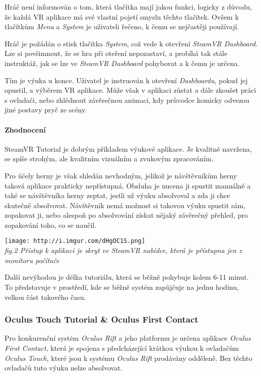 Hráč není informován o tom, která tlačítka mají jakou funkci, logicky z
důvodu, že každá VR aplikace má své vlastní pojetí smyslu těchto
tlačítek. Ovšem k tlačítkům \emph{Menu} a \emph{System} je uživateli
řečeno, k čemu se nejčastěji používají.

Hráč je požádán o stisk tlačítka \emph{System}, což vede k otevření
\emph{SteamVR Dashboard}. Lze si povšimnout, že se hra při oteření
nepozastaví, a probíhá tak stále instruktáž, jak se lze ve \emph{SteamVR
Dashboard} pohybovat a k čemu je určena.

Tím je výuka u konce. Uživatel je instruován k otevření
\emph{Dashboardu}, pokud jej opustil, a výběrem VR aplikace. Může však v
aplikaci zůstat a dále zkoušet práci s ovladači, nebo zhlédnout
závěrečnou animaci, kdy průvodce komicky odvezou jiné postavy pryč ze
scény.

\paragraph{Zhodnocení}\label{zhodnocenuxed}

SteamVR Tutorial je dobrým příkladem výukové aplikace. Je kvalitně
navržena, se spíše strohým, ale kvalitním vizuálním a zvukovým
zpracováním.

Pro účely herny je však shledán nevhodným, jelikož je návštěvníkům herny
taková aplikace prakticky nepřístupná. Obsluha je nucena ji spustit
manuálně a také se návštěvníka herny zeptat, jestli už výuku absolvoval
a zda ji chce skutečně absolvovat. Návštěvník nemá možnost si takovou
výuku spustit sám, zopakovat ji, nebo alespoň po absolvování získat
nějaký závěrečný přehled, pro zopakování toho, co se naučil.

\texttt{[image: http://i.imgur.com/dHgOC1S.png]}\\
\emph{fig.2 Přístup k aplikaci je skryt ve SteamVR nabídce, která je
přístupna jen z monitoru počítače}

Další nevýhodou je délka tutoriálu, která se běžně pohybuje kolem 6-11
minut. To představuje v prostředí, kde se běžně systém zapůjčuje na
jednu hodinu, velkou část takového času.

\subsubsection{Oculus Touch Tutorial \& Oculus First
Contact}\label{oculus-touch-tutorial-oculus-first-contact}

Pro konkurenční systém \emph{Oculus Rift} a jeho platformu je určena
aplikace \emph{Oculus First Contact}, která je spojena s předcházející
krátkou výukou k ovladačům \emph{Oculus Touch}, které jsou k systému
\emph{Oculus Rift} prodávány odděleně. Bez těchto ovladačů tuto výuku
nelze absolvovat.

